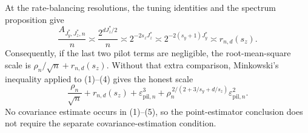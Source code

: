 At the rate-balancing resolutions, the tuning identities and the spectrum proposition give
\[
\frac{A_{J_y^*,J_z^*,n}}n
\asymp\frac{2^{dJ_z^*/2}}n
\asymp2^{-2s_zJ_z^*}
\asymp2^{-2(s_y+1)J_y^*}
\asymp r_{n,d}(s_z).                                                        \tag{5}
\]
Consequently, if the last two pilot terms are negligible, the root-mean-square scale is \(\rho_n/\sqrt n+r_{n,d}(s_z)\).  Without that extra comparison, Minkowski's inequality applied to (1)--(4) gives the honest scale
\[
\frac{\rho_n}{\sqrt n}+r_{n,d}(s_z)
+\varepsilon_{\mathrm{pil},n}^3
+\rho_n^{\,2/(2+3/s_y+d/s_z)}\varepsilon_{\mathrm{pil},n}^2.
\]
No covariance estimate occurs in (1)--(5), so the point-estimator conclusion does not require the separate covariance-estimation condition.